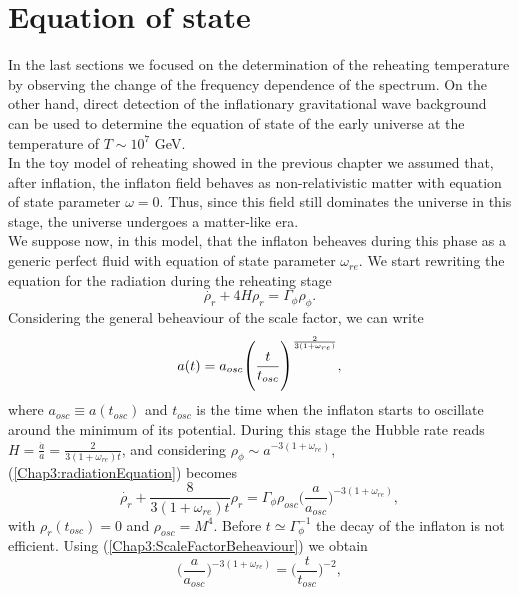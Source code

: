 \documentclass[11pt,a4paper,twoside]{book}
\begin{document}
\section{Equation of state}
In the last sections we focused on the determination of the reheating temperature by observing the change of the frequency dependence of the spectrum. On the other hand, direct detection of the inflationary gravitational wave background can be used to determine the equation of state of the early universe at the temperature of $ T \sim  10^{7}$ GeV.\\
In the toy model of reheating showed in the previous chapter we assumed that, after inflation, the inflaton field behaves as non-relativistic matter with equation of state parameter $\omega = 0$. Thus, since this field still dominates the universe in this stage, the universe undergoes a matter-like era. \\
We suppose now, in this model, that the inflaton beheaves during this phase as a generic perfect fluid with equation of state parameter $ \omega_{re} $.
We start rewriting the equation for the radiation during the reheating stage
\begin{equation}
	\label{Chap3:radiationEquation}
	\dot{\rho_{r}} + 4H\rho_{r} = \Gamma_{\phi}\rho_{\phi}.
\end{equation}
Considering the general beheaviour of the scale factor, we can write
\begin{equation}
	\label{Chap3:ScaleFactorBeheaviour}
	\large
	a(t)=a_{osc}\Bigg(\frac{t}{t_{osc}}\Bigg)^{\frac{2}{3(1+\omega_{re})}},
\end{equation}
where $ a_{osc} \equiv a(t_{osc}) $ and $ t_{osc} $ is the time when the inflaton starts to oscillate around the minimum of its potential. During this stage the Hubble rate reads $ H=\frac{\dot{a}}{a}= \frac{2}{3(1+\omega_{re})t} $, and considering $\rho_{\phi} \sim a^{-3(1+\omega_{re})}$, (\ref{Chap3:radiationEquation}) becomes
\begin{equation}
	\label{Chap3:radiationEquationReheating2}
	\dot{\rho_{r}} + \frac{8}{3(1+\omega_{re})t}\rho_{r} = \Gamma_{\phi}\rho_{osc}\Bigg(\frac{a}{a_{osc}}\Bigg)^{-3(1+\omega_{re})},
\end{equation}
with $\rho_{r}(t_{osc})=0$ and $ \rho_{osc} = M^{4} $.
Before $ t \simeq \Gamma_{\phi}^{-1} $ the decay of the inflaton is not efficient. Using (\ref{Chap3:ScaleFactorBeheaviour}) we obtain
\begin{equation}
	\label{Chap3:TimeBeheaviour}
	\Bigg(\frac{a}{a_{osc}}\Bigg)^{-3(1+\omega_{re})} =  \Bigg(\frac{t}{t_{osc}}\Bigg)^{-2},
\end{equation}
\end{document}
